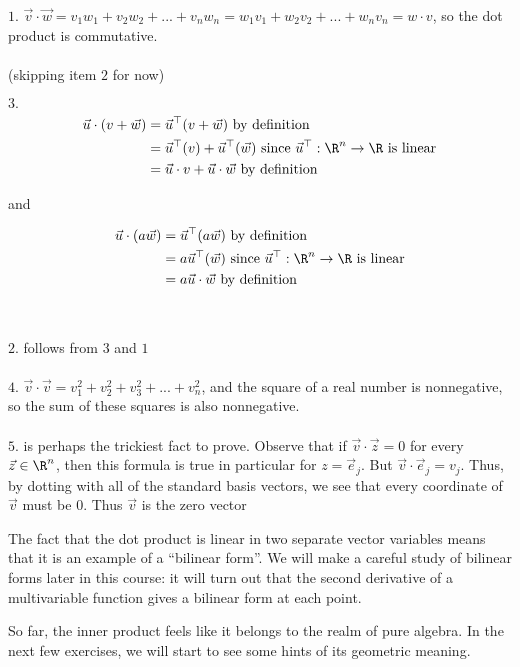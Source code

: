 \documentclass{ximera}
\begin{document}
\begin{free-response}
  $1.$  $\vec{v} \cdot \vec{w} = v_1w_1+v_2w_2+...+v_nw_n = w_1v_1+w_2v_2+...+w_nv_n = w \cdot v$, so the dot product is commutative.
  \\
  \\
  (skipping item $2$ for now)
  
  $3.$ \begin{align*}
    \vec{u} \cdot (v+\vec{w}) &= \vec{u}^\top(v +\vec{w}) \text{ by definition}\\
    &=\vec{u}^\top(v) + \vec{u}^\top(\vec{w}) \text{ since $\vec{u}^\top: \R^n \to \R$ is linear}\\
    &=\vec{u} \cdot v+\vec{u}\cdot \vec{w} \text{ by definition}
  \end{align*}
  
  and 
  
  \begin{align*}
    \vec{u}\cdot(a\vec{w}) &=\vec{u}^\top(a\vec{w}) \text{ by definition}\\
    &= a\vec{u}^\top(\vec{w}) \text{ since $\vec{u}^\top: \R^n \to \R$ is linear}\\
    &=a\vec{u}\cdot \vec{w} \text{ by definition}
  \end{align*}
  \\
  \\
  $2.$ follows from $3$ and $1$
  \\
  \\
  $4.$ $\vec{v} \cdot \vec{v} = v_1^2+v_2^2+v_3^2+...+v_n^2$, and the square of a real number is nonnegative, so the sum of these squares is also nonnegative.
  \\
  \\
  $5.$ is perhaps the trickiest fact to prove.  Observe that if $\vec{v} \cdot \vec{z} =0$ for every $\vec{z} \in \R^n$, then this formula is true
  in particular for $z=\vec{e}_j$.  But $\vec{v} \cdot \vec{e}_j = v_j$.  Thus, by dotting with all of the standard basis vectors, we see that every coordinate of $\vec{v}$ must
  be $0$.  Thus $\vec{v}$ is the zero vector
\end{free-response}
	
The fact that the dot product is linear in two separate vector
variables means that it is an example of a ``bilinear form''.  We will
make a careful study of bilinear forms later in this course: it will
turn out that the second derivative of a multivariable function gives
a bilinear form at each point.

So far, the inner product feels like it belongs to the realm of pure
algebra.  In the next few exercises, we will start to see some hints
of its geometric meaning.
\end{document}
